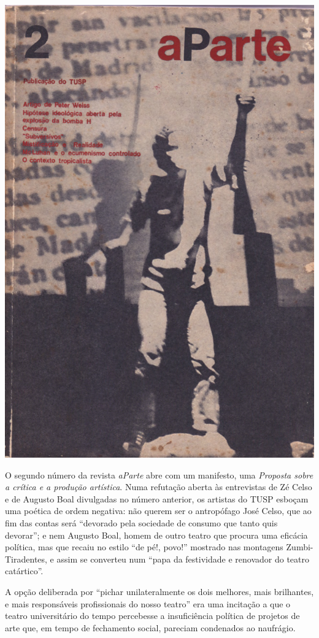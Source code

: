 \includegraphics[width=\columnwidth]{./media/IMAGEM58.jpg}

O segundo número da revista \textit{aParte} abre com um manifesto, uma
\textit{Proposta sobre a crítica e a produção artística}. Numa refutação
aberta às entrevistas de Zé Celso e de Augusto Boal divulgadas no número
anterior, os artistas do TUSP esboçam uma poética de ordem negativa: não
querem ser o antropófago José Celso, que ao fim das contas será
“devorado pela sociedade de consumo que tanto quis devorar”; e nem
Augusto Boal, homem de outro teatro que procura uma eficácia política,
mas que recaiu no estilo “de pé!, povo!” mostrado nas montagens
Zumbi-Tiradentes, e assim se converteu num “papa da festividade e
renovador do teatro catártico”.

A opção deliberada por “pichar unilateralmente os dois melhores, mais
brilhantes, e mais responsáveis profissionais do nosso teatro” era uma
incitação a que o teatro universitário do tempo percebesse a
insuficiência política de projetos de arte que, em tempo de fechamento
social, pareciam condenados ao naufrágio.

